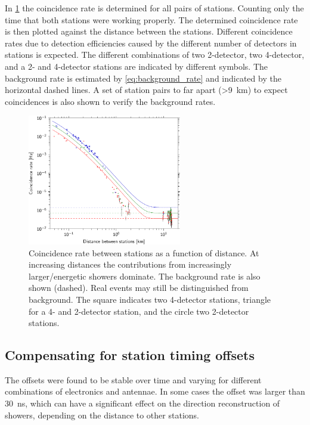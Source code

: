 In \cref{fig:distance_v_coincidence_rate} the coincidence rate is determined for all pairs of stations. Counting only the time that both stations were working properly. The determined coincidence rate is then plotted against the distance between the stations. Different coincidence rates due to detection efficiencies caused by the different number of detectors in stations is expected. The different combinations of two 2-detector, two 4-detector, and a 2- and 4-detector stations are indicated by different symbols. The background rate is estimated by \cref{eq:background_rate} and indicated by the horizontal dashed lines. A set of station pairs to far apart (\SI{>9}{\kilo\meter}) to expect coincidences is also shown to verify the background rates.

\begin{figure}
    \centering
    \includegraphics[width=0.6\textwidth]
                    {plots/cluster/distance_v_coincidence_rate}
    \caption{Coincidence rate between stations as a function of distance. At increasing distances the contributions from increasingly larger/energetic showers dominate. The background rate is also shown (dashed). Real events may still be distinguished from background. The square indicates two 4-detector stations, triangle for a 4- and 2-detector station, and the circle two 2-detector stations.}
    \label{fig:distance_v_coincidence_rate}
\end{figure}


\subsection{Compensating for station timing offsets}

The offsets were found to be stable over time and varying for different combinations of \hisparc electronics and \gps antennae. In some cases the offset was larger than \SI{30}{\ns}, which can have a significant effect on the direction reconstruction of showers, depending on the distance to other stations.

